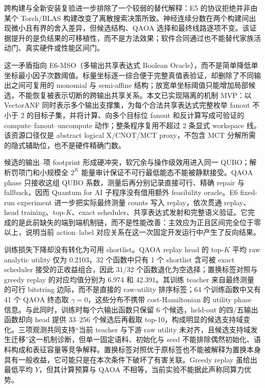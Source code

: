 \documentclass[UTF8,fontset=fandol,11pt]{ctexart}
\newcommand{\qaoa}{\ensuremath{\mathrm{QAOA}}}
\begin{document}
跨构建与全新安装复验进一步排除了一个较弱的替代解释：E5 的协议拒绝并非由某个 Torch/BLAS 构建改变了离散搜索决策所致。神经连续分数在两个构建间出现微小且有界的舍入差异，但候选结构、\qaoa{} 选择和最终线路逐项不变。该证据提升的是负结果的可移植性，而不是方法效果；软件合同通过也不能替代家族活动门、真实硬件或性能区间门。

这一矛盾指向 E6-MSO（多输出共享表达式 Boolean Oracle），而不是简单降低单坐标最小因子次数阈值。标量坐标逐一综合便于完整真值表验证，却删除了不同输出之间可复用的 monomial 与 semi-affine 结构；放宽单坐标阈值只能增加局部候选，不能恢复被表示切断的跨输出共享关系。本文已实现隔离的机制 MVP：以 VectorANF 同时表示多个输出支撑集，为每个合法共享表达式完整枚举 fanout 不小于 2 的目标子集，并将计算、向多个目标位 fanout 和反计算写成可验证的 compute--fanout--uncompute 动作；整条程序复用不超过 2 条显式 workspace 线。该资源口径仅是 abstract logical X/CNOT/MCT proxy，不包含 MCT 分解所需的隐式辅助位，也不是硬件精确门数。

候选的输出--项 footprint 形成硬冲突，软冗余与操作级效用进入同一 QUBO；解析罚项门和小规模全 $2^K$ 能量审计保证不可行最低能态不能被静默接受。\qaoa{} phase 只接收这组 QUBO 系数，测量后再分别记录直接可行、精确 repair 与 fallback，因而 Quantum for AI 子程序没有借用额外 feasibility oracle。E6 fixed-run experiment 进一步把实际最终测量 counts 写入 replay，依次贯通 replay、head training、top-$K$、exact scheduler、共享表达式发射和完整语义验证。它完成的是此前缺失的端到端机制链，而不是性能改善：主效应为正且区间完全位于零以上，说明当前 action--label 对应关系在这一次固定开发运行中产生了反向结果。

训练损失下降却没有转化为可用 shortlist。\qaoa{} replay head 的 top-$K$ 平均 raw analytic utility 仅为 0.2103，32 个函数中只有 1 个 shortlist 含可被 exact scheduler 接受的正收益组合，因此 31/32 个函数退化为空选择；置换标签对照与 greedy replay 的对应均值分别为 6.974 和 42.391。其训练 teacher 来自最终测量的可行 bitstring 边际，而不是直接的 raw-utility 排序标签；64 个训练函数中又有 41 个 \qaoa{} 终态取 $\gamma=0$，这些分布不携带 cost-Hamiltonian 的 utility phase 信息。与此同时，训练时每个六输出函数只保留 6 个候选，held-out 的四/五输出函数却向 head 提供 33--256 个候选后再截取 top-10，构成明显的候选支持域变化。三项观测共同支持“当前 teacher 与下游 raw utility 未对齐，且候选支持域发生迁移”这一机制诊断，但单一固定语料、初始化与 seed 不能排除偶然初始化、语料构成和表征容量等竞争解释。置换标签对照优于原标签也不能被解释为置换本身具有一般收益，它可能只是在本次条件下破坏了有害关联。Greedy replay 虽给出最低平均 $Y$，但其计算预算与 \qaoa{} 不相等，当前实验不能据此声称同算力优势。
\end{document}
